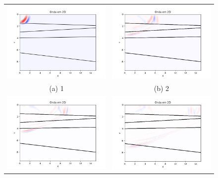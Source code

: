                 \begin{figure}[H]
                    \begin{tabular}{cc}
                        \includegraphics[width=65mm]{imagens/FDMimages/Teste00.png} & \includegraphics[width=65mm]{imagens/FDMimages/Teste03.png} \\
                        (a) 1 & (b) 2 \\
                        [6pt] \includegraphics[width=65mm]{imagens/FDMimages/Teste05.png} & \includegraphics[width=65mm]{imagens/FDMimages/Teste010.png} \\

\end{tabular}
\end{figure}
